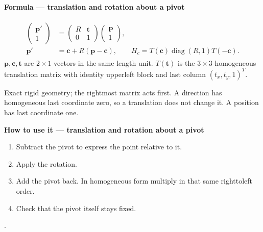 \documentclass[letterpaper,11pt,english,openany,oneside]{jupyterBook}
\begin{document}
\begin{TextbookBox}
\textbf{Formula — translation and rotation about a pivot}\par\smallskip
\begin{equation}\label{equation:lectures/lecture01/transformations:eq-lec01-rigid2}
\begin{split}\begin{aligned}
\begin{pmatrix}\mathbf{p}'\\1\end{pmatrix}
&=\begin{pmatrix}R&\mathbf{t}\\0&1\end{pmatrix}
\begin{pmatrix}\mathbf{p}\\1\end{pmatrix},\\
\mathbf{p}'&=\mathbf{c}+R(\mathbf{p}-\mathbf{c}),\qquad
H_c=T(\mathbf{c})\operatorname{diag}(R,1)T(-\mathbf{c}).
\end{aligned}\end{split}
\end{equation}
\sphinxAtStartPar
\(\mathbf{p},\mathbf{c},\mathbf{t}\) are \(2\times1\) vectors in the same length unit. \(T(\mathbf{t})\) is the \(3\times3\) homogeneous translation matrix with identity upper\sphinxhyphen{}left block and last column \((t_x,t_y,1)^T\).

\sphinxAtStartPar
{} Exact rigid geometry; the rightmost matrix acts first. A direction has homogeneous last coordinate zero, so a translation does not change it. A position has last coordinate one.

\end{TextbookBox}

\begin{TextbookBox}
\textbf{How to use it — translation and rotation about a pivot}\par\smallskip
\begin{enumerate}
%
\item {}
\sphinxAtStartPar
Subtract the pivot to express the point relative to it.

\item {}
\sphinxAtStartPar
Apply the rotation.

\item {}
\sphinxAtStartPar
Add the pivot back. In homogeneous form multiply in that same right\sphinxhyphen{}to\sphinxhyphen{}left order.

\item {}
\sphinxAtStartPar
Check that the pivot itself stays fixed.

\end{enumerate}

\sphinxAtStartPar
{} {\hyperref[\detokenize{lectures/lecture01/transformations:ex-lec01-pivot}]{}}.

\end{TextbookBox}
\end{document}
